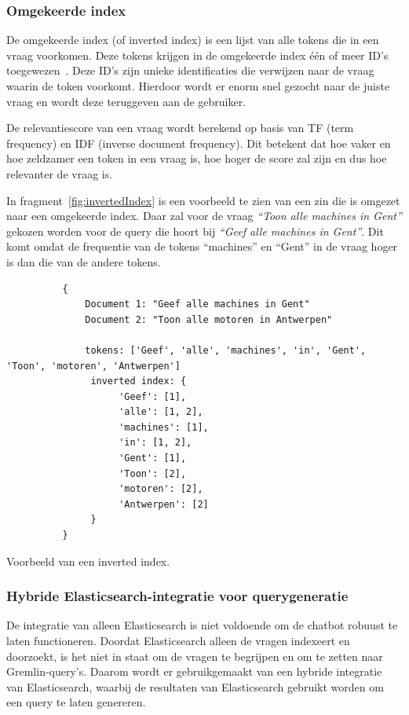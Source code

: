 \subsubsection{Omgekeerde index}
De omgekeerde index (of inverted index) is een lijst van alle tokens die in een vraag voorkomen. Deze tokens krijgen in de omgekeerde index één of meer ID's toegewezen~\autocite{Vatsya2024}.
Deze ID's zijn unieke identificaties die verwijzen naar de vraag waarin de token voorkomt. Hierdoor wordt er enorm snel gezocht naar de juiste vraag en wordt deze teruggeven aan de gebruiker.

De relevantiescore van een vraag wordt berekend op basis van TF (term frequency) en IDF (inverse document frequency).
Dit betekent dat hoe vaker en hoe zeldzamer een token in een vraag is, hoe hoger de score zal zijn en dus hoe relevanter de vraag is.

In fragment~\ref{fig:invertedIndex} is een voorbeeld te zien van een zin die is omgezet naar een omgekeerde index.
Daar zal voor de vraag \emph{``Toon alle machines in Gent''} gekozen worden voor de query die hoort bij \emph{``Geef alle machines in Gent''}.
Dit komt omdat de frequentie van de tokens ``machines'' en ``Gent'' in de vraag hoger is dan die van de andere tokens.

\begin{listing}[H]
     \begin{verbatim}
          {
              Document 1: "Geef alle machines in Gent"
              Document 2: "Toon alle motoren in Antwerpen"

              tokens: ['Geef', 'alle', 'machines', 'in', 'Gent', 'Toon', 'motoren', 'Antwerpen']
               inverted index: {
                    'Geef': [1],
                    'alle': [1, 2],
                    'machines': [1],
                    'in': [1, 2],
                    'Gent': [1],
                    'Toon': [2],
                    'motoren': [2],
                    'Antwerpen': [2]
               }
          }
     \end{verbatim}
     \caption[Voorbeeld inverted index]{\label{fig:invertedIndex}Voorbeeld van een inverted index.}
\end{listing}

\subsubsection{Hybride Elasticsearch-integratie voor querygeneratie}{\label{sec:hybride-elasticsearch}}
De integratie van alleen Elasticsearch is niet voldoende om de chatbot robuust te laten functioneren.
Doordat Elasticsearch alleen de vragen indexeert en doorzoekt, is het niet in staat om de vragen te begrijpen en om te zetten naar Gremlin-query's.
Daarom wordt er gebruikgemaakt van een hybride integratie van Elasticsearch, waarbij de resultaten van Elasticsearch gebruikt worden om een query te laten genereren.


